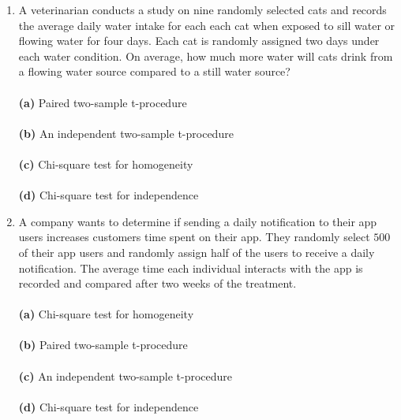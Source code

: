 \documentclass[12pt]{article}
\begin{document}
\begin{enumerate}[leftmargin=\labelsep]
\item A veterinarian conducts a study on nine randomly selected cats and records the average daily water intake for each each cat when exposed to sill water or flowing water for four days. Each cat is randomly assigned two days under each water condition. On average, how much more water will cats drink from a flowing water source compared to a still water source?\\ \vspace{1mm}\\
{\bf (a)} \hspace{2mm} Paired two-sample t-procedure\\ \vspace{1mm}\\
{\bf (b)} \hspace{2mm} An independent two-sample t-procedure\\   \vspace{1mm}\\
{\bf (c)} \hspace{2mm} Chi-square test for homogeneity\\  \vspace{1mm}\\
{\bf (d)} \hspace{2mm} Chi-square test for independence\\

\item A company wants to determine if sending a daily notification to their app users increases customers time spent on their app. They randomly select $500$ of their app users and randomly assign half of the users to receive a daily notification. The average time each individual interacts with the app is recorded and compared after two weeks of the treatment.\\
\vspace{1mm}\\
{\bf (a)} \hspace{2mm} Chi-square test for homogeneity\\ \vspace{1mm}\\
{\bf (b)} \hspace{2mm} Paired two-sample t-procedure\\   \vspace{1mm}\\
{\bf (c)} \hspace{2mm} An independent two-sample t-procedure\\ \vspace{1mm}\\  
{\bf (d)} \hspace{2mm} Chi-square test for independence\\



\end{enumerate}
\end{document}

